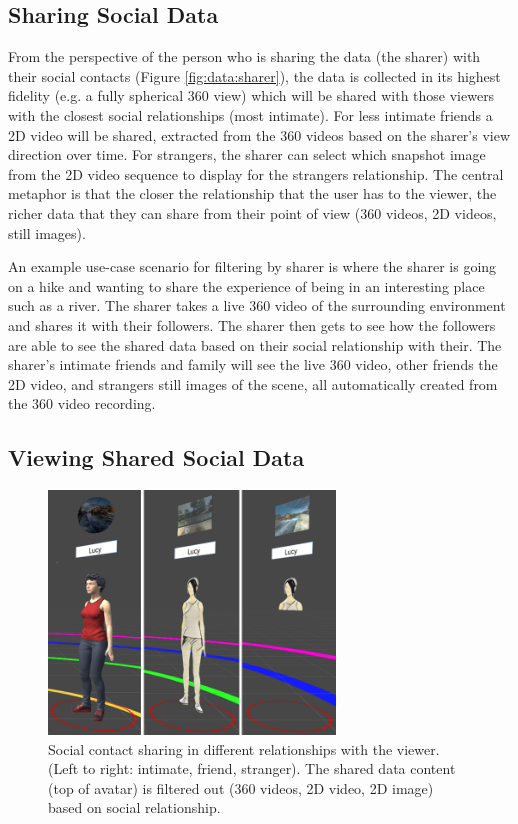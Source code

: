 \subsection{Sharing Social Data}

From the perspective of the person who is sharing the data (the sharer) with their social contacts (Figure \ref{fig:data:sharer}), the data is collected in its highest fidelity (e.g. a fully spherical 360 view) which will be shared with those viewers with the closest social relationships (most intimate). For less intimate friends a 2D video will be shared, extracted from the 360 videos based on the sharer's view direction over time. For strangers, the sharer can select which snapshot image from the 2D video sequence to display for the strangers relationship. The central metaphor is that the closer the relationship that the user has to the viewer, the richer data that they can share from their point of view (360 videos, 2D videos, still images).

An example use-case scenario for filtering by sharer is where the sharer is going on a hike and wanting to share the experience of being in an interesting place such as a river. The sharer takes a live 360 video of the surrounding environment and shares it with their followers. The sharer then gets to see how the followers are able to see the shared data based on their social relationship with their. The sharer's intimate friends and family will see the live 360 video, other friends the 2D video, and strangers still images of the scene, all automatically created from the 360 video recording.

\subsection{Viewing Shared Social Data}

\begin{figure}[ht]
    \centering
    \includegraphics[width=3in]{images/chi/3_levels_of_data.png}
    \caption{Social contact sharing in different relationships with the viewer. (Left to right: intimate, friend, stranger). The shared data content (top of avatar) is filtered out (360 videos, 2D video, 2D image) based on social relationship.}
      \label{fig:data:viewer}
\end{figure}

